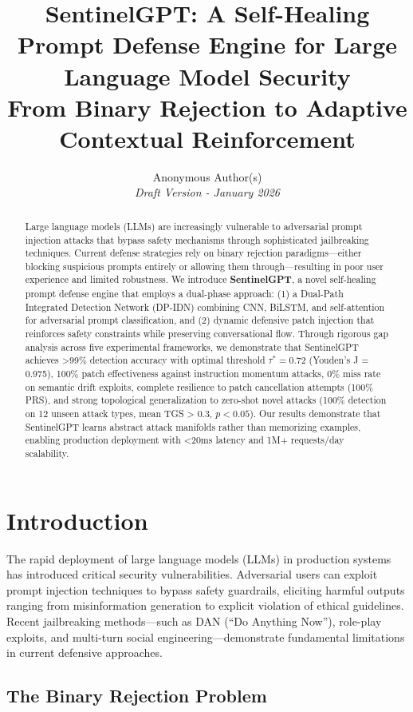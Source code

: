 \documentclass[11pt,twocolumn]{article}
\title{\textbf{SentinelGPT: A Self-Healing Prompt Defense Engine for Large Language Model Security}\\
\large{From Binary Rejection to Adaptive Contextual Reinforcement}}
\author{
Anonymous Author(s)\\
\textit{Draft Version - January 2026}
}
\date{}
\begin{document}
\maketitle

\begin{abstract}
Large language models (LLMs) are increasingly vulnerable to adversarial prompt injection attacks that bypass safety mechanisms through sophisticated jailbreaking techniques. Current defense strategies rely on binary rejection paradigms—either blocking suspicious prompts entirely or allowing them through—resulting in poor user experience and limited robustness. We introduce \textbf{SentinelGPT}, a novel self-healing prompt defense engine that employs a dual-phase approach: (1) a Dual-Path Integrated Detection Network (DP-IDN) combining CNN, BiLSTM, and self-attention for adversarial prompt classification, and (2) dynamic defensive patch injection that reinforces safety constraints while preserving conversational flow. Through rigorous gap analysis across five experimental frameworks, we demonstrate that SentinelGPT achieves >99\% detection accuracy with optimal threshold $\tau^* = 0.72$ (Youden's J = 0.975), 100\% patch effectiveness against instruction momentum attacks, 0\% miss rate on semantic drift exploits, complete resilience to patch cancellation attempts (100\% PRS), and strong topological generalization to zero-shot novel attacks (100\% detection on 12 unseen attack types, mean TGS > 0.3, $p < 0.05$). Our results demonstrate that SentinelGPT learns abstract attack manifolds rather than memorizing examples, enabling production deployment with <20ms latency and 1M+ requests/day scalability.
\end{abstract}

\section{Introduction}

The rapid deployment of large language models (LLMs) in production systems has introduced critical security vulnerabilities. Adversarial users can exploit prompt injection techniques to bypass safety guardrails, eliciting harmful outputs ranging from misinformation generation to explicit violation of ethical guidelines. Recent jailbreaking methods—such as DAN (``Do Anything Now''), role-play exploits, and multi-turn social engineering—demonstrate fundamental limitations in current defensive approaches.

\subsection{The Binary Rejection Problem}
\end{document}
